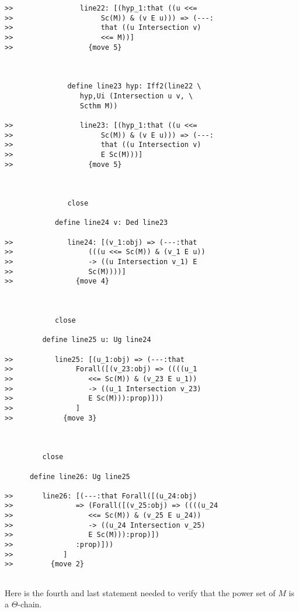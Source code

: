 \documentclass[12pt]{article}
\begin{document}
\begin{verbatim}
>>                line22: [(hyp_1:that ((u <<=
>>                     Sc(M)) & (v E u))) => (---:
>>                     that ((u Intersection v)
>>                     <<= M))]
>>                  {move 5}



               define line23 hyp: Iff2(line22 \
                  hyp,Ui (Intersection u v, \
                  Scthm M))

>>                line23: [(hyp_1:that ((u <<=
>>                     Sc(M)) & (v E u))) => (---:
>>                     that ((u Intersection v)
>>                     E Sc(M)))]
>>                  {move 5}



               close

            define line24 v: Ded line23

>>             line24: [(v_1:obj) => (---:that
>>                  (((u <<= Sc(M)) & (v_1 E u))
>>                  -> ((u Intersection v_1) E
>>                  Sc(M))))]
>>               {move 4}



            close

         define line25 u: Ug line24

>>          line25: [(u_1:obj) => (---:that
>>               Forall([(v_23:obj) => ((((u_1
>>                  <<= Sc(M)) & (v_23 E u_1))
>>                  -> ((u_1 Intersection v_23)
>>                  E Sc(M))):prop)]))
>>               ]
>>            {move 3}



         close

      define line26: Ug line25

>>       line26: [(---:that Forall([(u_24:obj)
>>               => (Forall([(v_25:obj) => ((((u_24
>>                  <<= Sc(M)) & (v_25 E u_24))
>>                  -> ((u_24 Intersection v_25)
>>                  E Sc(M))):prop)])
>>               :prop)]))
>>            ]
>>         {move 2}


\end{verbatim}

Here is the fourth and last statement needed to verify that the power set of $M$ is a $\Theta$-chain.
\end{document}
